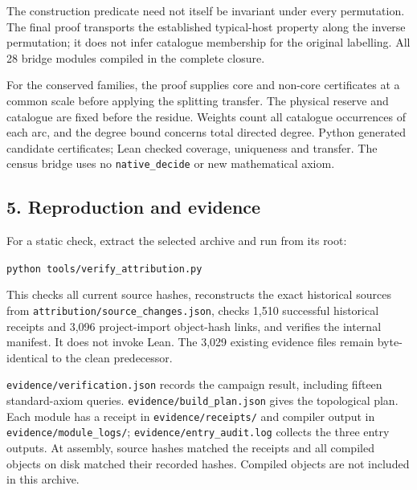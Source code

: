 \documentclass[english,11pt,a4paper]{article}
\begin{document}
The construction predicate need not itself be invariant under every permutation. The final proof transports the established typical-host property along the inverse permutation; it does not infer catalogue membership for the original labelling. All 28 bridge modules compiled in the complete closure.

For the conserved families, the proof supplies core and non-core certificates at a common scale before applying the splitting transfer. The physical reserve and catalogue are fixed before the residue. Weights count all catalogue occurrences of each arc, and the degree bound concerns total directed degree. Python generated candidate certificates; Lean checked coverage, uniqueness and transfer. The census bridge uses no \texttt{native\_\allowbreak{}decid\allowbreak{}e} or new mathematical axiom.


\subsection{5. Reproduction and evidence}\label{reproduction-and-evidence}

For a static check, extract the selected archive and run from its root:

\texttt{python tools\allowbreak{}/\allowbreak{}verify\_\allowbreak{}attr\allowbreak{}ibution.\allowbreak{}py}

This checks all current source hashes, reconstructs the exact historical sources from \texttt{attribution/\allowbreak{}\allowbreak{}source\_\allowbreak{}chang\allowbreak{}es.\allowbreak{}json}, checks 1,510 successful historical receipts and 3,096 project-import object-hash links, and verifies the internal manifest. It does not invoke Lean. The 3,029 existing evidence files remain byte-identical to the clean predecessor.

\texttt{evidence/\allowbreak{}ver\allowbreak{}ification.\allowbreak{}js\allowbreak{}on} records the campaign result, including fifteen standard-axiom queries. \texttt{evidence/\allowbreak{}bui\allowbreak{}ld\_\allowbreak{}plan.\allowbreak{}json\allowbreak{}} gives the topological plan. Each module has a receipt in \texttt{evidence/\allowbreak{}rec\allowbreak{}eipts/\allowbreak{}} and compiler output in \texttt{evidence/\allowbreak{}mod\allowbreak{}ule\_\allowbreak{}logs/\allowbreak{}}; \texttt{evidence/\allowbreak{}ent\allowbreak{}ry\_\allowbreak{}audit.\allowbreak{}log\allowbreak{}} collects the three entry outputs. At assembly, source hashes matched the receipts and all compiled objects on disk matched their recorded hashes. Compiled objects are not included in this archive.
\end{document}
